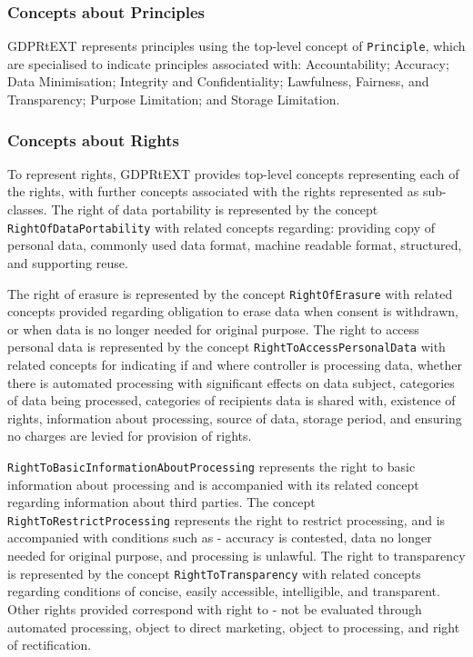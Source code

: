 \subsubsection{Concepts about Principles}
GDPRtEXT represents principles using the top-level concept of \texttt{Principle}, which are specialised to indicate principles associated with: Accountability; Accuracy; Data Minimisation; Integrity and Confidentiality; Lawfulness, Fairness, and Transparency; Purpose Limitation; and Storage Limitation.

\subsubsection{Concepts about Rights}
To represent rights, GDPRtEXT provides top-level concepts representing each of the rights, with further concepts associated with the rights represented as sub-classes. The right of data portability is represented by the concept \texttt{RightOfDataPortability} with related concepts regarding: providing copy of personal data, commonly used data format, machine readable format, structured, and supporting reuse.

The right of erasure is represented by the concept \texttt{RightOfErasure} with related concepts provided regarding obligation to erase data when consent is withdrawn, or when data is no longer needed for original purpose. The right to access personal data is represented by the concept \texttt{RightToAccessPersonalData} with related concepts for indicating if and where controller is processing data, whether there is automated processing with significant effects on data subject, categories of data being processed, categories of recipients data is shared with, existence of rights, information about processing, source of data, storage period, and ensuring no charges are levied for provision of rights.

\texttt{RightToBasicInformationAboutProcessing} represents the right to basic information about processing and is accompanied with its related concept regarding information about third parties. The concept \texttt{RightToRestrictProcessing} represents the right to restrict processing, and is accompanied with conditions such as - accuracy is contested, data no longer needed for original purpose, and processing is unlawful. The right to transparency is represented by the concept \texttt{RightToTransparency} with related concepts regarding conditions of concise, easily accessible, intelligible, and transparent. Other rights provided correspond with right to - not be evaluated through automated processing, object to direct marketing,  object to processing, and right of rectification.

